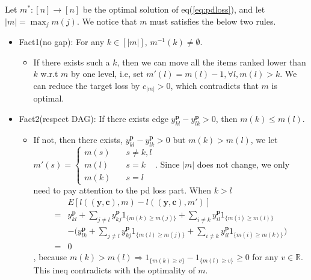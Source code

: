 Let $m^*: [n]\rightarrow [n]$ be the optimal solution of eq(\ref{eq:pdloss}), and let $|m|=\max_jm(j)$. We notice that $m$ must satisfies the below two rules.
\begin{itemize}
	\item Fact1(no gap): For any $k\in[|m|]$, $m^{-1}(k)\not=\emptyset$. 
	\begin{itemize}
		\item If there exists such a $k$, then we can move all the items ranked lower than $k$ w.r.t $m$ by one level, i.e, set $m'(l)=m(l)-1, \forall l, m(l)>k$. We can reduce the target loss by $c_{|m|}>0$, which contradicts that $m$ is optimal.
	\end{itemize}
	\item Fact2(respect DAG): If there exists edge $y_{kl}^\mathbf{p}-y_{lk}^\mathbf{p}>0$, then $m(k)\leq m(l)$.
	\begin{itemize}
		\item If not, then there exists,  $y_{kl}^\mathbf{p}-y_{lk}^\mathbf{p}>0$ but $m(k)>m(l)$, we let $m'(s)=\begin{cases}
		m(s)&\quad{s\not=k,l}\\
		m(l)&\quad{s=k}\\
		m(k)&\quad{s=l}
		\end{cases}$. Since $|m|$ does not change, we only need to pay attention to the pd loss part. When $k>l$ \begin{equation}
		\begin{split}
		&E[l((\mathbf{y},\mathbf{c}),  m)-l((\mathbf{y},\mathbf{c}),  m')]\\
		=&y_{kl}^\mathbf{p}+\sum\limits_{j\not=l}y_{kj}^\mathbf{p}1_{\{m(k)\geq m(j)\}}+\sum\limits_{i\not=k}y_{il}^\mathbf{p}1_{\{m(i)\geq m(l)\}}\\
		&-\bigg(y_{lk}^\mathbf{p}+\sum\limits_{j\not=l}y_{kj}^\mathbf{p}1_{\{m(l)\geq m(j)\}}+\sum\limits_{i\not=k}y_{il}^\mathbf{p}1_{\{m(i)\geq m(k)\}}\bigg)\\
		=&0
		\end{split}
		\end{equation}
		, because $m(k)>m(l)\Rightarrow 1_{\{m(k)\geq v\}}-1_{\{m(l)\geq v\}}\geq 0$ for any $v\in \mathbb{R}$. This ineq contradicts with the optimality of $m$. 
	\end{itemize}
\end{itemize}

